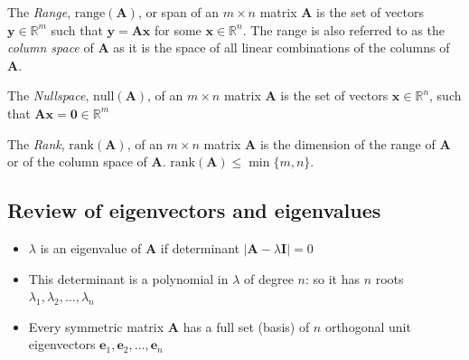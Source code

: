 The {\em Range}, $\mathrm{range}(\mathbf{A})$, or span of an $m\times n$ matrix $\mathbf{A}$ 
is  the set of vectors $\mathbf{y}\in\mathbb{R}^m$ such that $\mathbf{y}=\mathbf{A}\mathbf{x}$ for some $\mathbf{x}\in\mathbb{R}^n$.  The range is also referred to as the {\em column space} of  $\mathbf{A}$ as it is the space of all linear combinations of the columns of $\mathbf{A}$.


The {\em Nullspace}, $\mathrm{null}(\mathbf{A})$, of an $m\times n$ matrix $\mathbf{A}$
is the set of vectors $\mathbf{x}\in\mathbb{R}^n$, such that $\mathbf{A}\mathbf{x}=\mathbf{0}\in\mathbb{R}^m$ 

The {\em Rank}, $\mathrm{rank}(\mathbf{A})$, of an $m\times n$ matrix $\mathbf{A}$ is the dimension of the range of $\mathbf{A}$ or of the column space of $\mathbf{A}$.  $\mathrm{rank}(\mathbf{A}) \leq \min\{m,n\}$.

\newpage

\subsection{Review of eigenvectors and eigenvalues}

\begin{itemize}
\item $\lambda$ is an eigenvalue of $\mathbf{A}$ if determinant $\vert\mathbf{A}-\lambda\mathbf{I}\vert=0$
\item This determinant is a polynomial in $\lambda$ of degree $n$:  so it has 
$n$ roots $\lambda_1,\lambda_2,\ldots,\lambda_n$
\item Every {symmetric} matrix $\mathbf{A}$ has a full set ({basis}) of $n$ orthogonal unit eigenvectors
$\mathbf{e}_1,\mathbf{e}_2,\ldots,\mathbf{e}_n$
\end{itemize}


